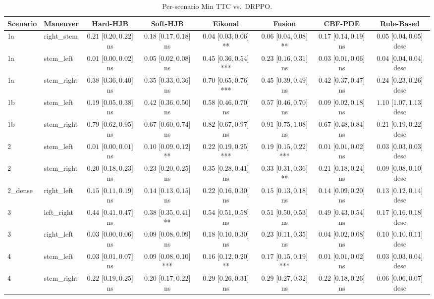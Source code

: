 \begin{table}[ht]
\centering
\caption{Per-scenario Min TTC vs.\ DRPPO.}
\label{tab:per_scenario_min_ttc}
\begin{tabular}{llcccccc}
\toprule
Scenario & Maneuver & Hard-HJB & Soft-HJB & Eikonal & Fusion & CBF-PDE & Rule-Based \\
\midrule
1a & right_stem & $0.21$ [$0.20, 0.22$] ns & $0.18$ [$0.17, 0.18$] ns & $0.04$ [$0.03, 0.06$] ** & $0.06$ [$0.04, 0.08$] ** & $0.17$ [$0.14, 0.19$] ns & $0.05$ [$0.04, 0.05$] desc \\
1a & stem_left & $0.01$ [$0.00, 0.02$] ns & $0.05$ [$0.02, 0.08$] ns & $0.45$ [$0.36, 0.54$] *** & $0.23$ [$0.16, 0.31$] ns & $0.03$ [$0.01, 0.06$] ns & $0.04$ [$0.04, 0.04$] desc \\
1a & stem_right & $0.38$ [$0.36, 0.40$] ns & $0.35$ [$0.33, 0.36$] ns & $0.70$ [$0.65, 0.76$] *** & $0.45$ [$0.39, 0.49$] ns & $0.42$ [$0.37, 0.47$] ns & $0.24$ [$0.23, 0.26$] desc \\
1b & stem_left & $0.19$ [$0.05, 0.38$] ns & $0.42$ [$0.36, 0.50$] ns & $0.58$ [$0.46, 0.70$] ns & $0.57$ [$0.46, 0.70$] ns & $0.09$ [$0.02, 0.18$] ns & $1.10$ [$1.07, 1.13$] desc \\
1b & stem_right & $0.79$ [$0.62, 0.95$] ns & $0.67$ [$0.60, 0.74$] ns & $0.82$ [$0.67, 0.97$] ns & $0.91$ [$0.75, 1.08$] ns & $0.67$ [$0.48, 0.84$] ns & $0.21$ [$0.19, 0.22$] desc \\
2 & stem_left & $0.01$ [$0.00, 0.01$] ns & $0.10$ [$0.09, 0.12$] ** & $0.22$ [$0.19, 0.25$] *** & $0.19$ [$0.15, 0.22$] *** & $0.01$ [$0.01, 0.02$] ns & $0.03$ [$0.03, 0.03$] desc \\
2 & stem_right & $0.20$ [$0.18, 0.23$] ns & $0.23$ [$0.20, 0.25$] ns & $0.35$ [$0.28, 0.41$] ns & $0.33$ [$0.31, 0.36$] ** & $0.21$ [$0.18, 0.24$] ns & $0.09$ [$0.08, 0.10$] desc \\
2_dense & right_left & $0.15$ [$0.11, 0.19$] ns & $0.14$ [$0.13, 0.15$] ns & $0.22$ [$0.16, 0.30$] ns & $0.15$ [$0.13, 0.18$] ns & $0.14$ [$0.09, 0.20$] ns & $0.13$ [$0.12, 0.14$] desc \\
3 & left_right & $0.44$ [$0.41, 0.47$] ns & $0.38$ [$0.35, 0.41$] ** & $0.54$ [$0.51, 0.58$] ns & $0.51$ [$0.50, 0.53$] ns & $0.49$ [$0.43, 0.54$] ns & $0.17$ [$0.16, 0.18$] desc \\
3 & right_left & $0.03$ [$0.00, 0.06$] ns & $0.09$ [$0.08, 0.09$] ns & $0.18$ [$0.10, 0.30$] ns & $0.23$ [$0.11, 0.35$] ns & $0.04$ [$0.02, 0.08$] ns & $0.10$ [$0.10, 0.11$] desc \\
4 & stem_left & $0.03$ [$0.01, 0.07$] ns & $0.09$ [$0.08, 0.10$] *** & $0.16$ [$0.12, 0.20$] ** & $0.17$ [$0.15, 0.19$] *** & $0.01$ [$0.01, 0.02$] ns & $0.03$ [$0.03, 0.04$] desc \\
4 & stem_right & $0.22$ [$0.19, 0.25$] ns & $0.20$ [$0.17, 0.22$] ns & $0.29$ [$0.26, 0.31$] ns & $0.29$ [$0.27, 0.32$] ns & $0.22$ [$0.18, 0.26$] ns & $0.06$ [$0.06, 0.07$] desc \\
\bottomrule
\end{tabular}
\end{table}
